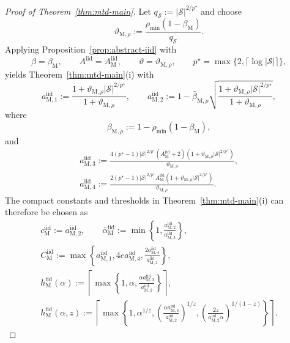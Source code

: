 \documentclass{article}
\newcommand{\X}{\mathcal{S}}
\begin{document}
\begin{proof}[Proof of Theorem~\ref{thm:mtd-main}]
Let $q_{\X}:=\lvert\X\rvert^{2/p^\star}$ and choose
\begin{equation}
\vartheta_{\mathrm M,\rho}:=\frac{\rho_{\min}(1-\beta_{\mathrm M})}{q_{\X}}.
\end{equation}
Applying Proposition~\ref{prop:abstract-iid} with
\begin{equation}
\beta = \beta_{\mathrm M}, \qquad A^{\mathrm{iid}} = A_{\mathrm M}^{\mathrm{iid}}, \qquad \vartheta = \vartheta_{\mathrm M,\rho}, \qquad p^\star = \max\{2,\lceil \log \lvert \X \rvert \rceil\},
\end{equation}
yields Theorem~\ref{thm:mtd-main}(i) with
\begin{equation}
a_{\mathrm M,1}^{\mathrm{iid}} := \frac{1 + \vartheta_{\mathrm M,\rho}\lvert \X \rvert^{2/p^\star}}{1+\vartheta_{\mathrm M,\rho}}, \qquad a_{\mathrm M,2}^{\mathrm{iid}} := 1-\bar\beta_{\mathrm M,\rho}\sqrt{\frac{1 + \vartheta_{\mathrm M,\rho}\lvert \X \rvert^{2/p^\star}}{1+\vartheta_{\mathrm M,\rho}}},
\end{equation}
where
\begin{equation}
\bar\beta_{\mathrm M,\rho} := 1-\rho_{\min}(1-\beta_{\mathrm M}),
\end{equation}
and
\begin{equation}
\begin{gathered}
a_{\mathrm M,3}^{\mathrm{iid}} := \frac{4(p^\star-1)\lvert \X \rvert^{2/p^\star}(A_{\mathrm M}^{\mathrm{iid}}+2)(1+\vartheta_{\mathrm M,\rho}\lvert \X \rvert^{2/p^\star})}{\vartheta_{\mathrm M,\rho}},\\
a_{\mathrm M,4}^{\mathrm{iid}} := \frac{2(p^\star-1)\lvert \X \rvert^{2/p^\star}A_{\mathrm M}^{\mathrm{iid}}(1+\vartheta_{\mathrm M,\rho}\lvert \X \rvert^{2/p^\star})}{\vartheta_{\mathrm M,\rho}}.
\end{gathered}
\end{equation}
The compact constants and thresholds in Theorem~\ref{thm:mtd-main}(i) can therefore be chosen as
\begin{equation}
\begin{gathered}
c_{\mathrm M}^{\mathrm{iid}}:=a_{\mathrm M,2}^{\mathrm{iid}},\qquad
\bar\alpha_{\mathrm M}^{\mathrm{iid}}:=\min\left\{1,\frac{a_{\mathrm M,2}^{\mathrm{iid}}}{a_{\mathrm M,3}^{\mathrm{iid}}}\right\},\\
C_{\mathrm M}^{\mathrm{iid}}:=\max\left\{a_{\mathrm M,1}^{\mathrm{iid}},4e a_{\mathrm M,4}^{\mathrm{iid}},\frac{2a_{\mathrm M,4}^{\mathrm{iid}}}{a_{\mathrm M,2}^{\mathrm{iid}}}\right\},\\
h_{\mathrm M}^{\mathrm{iid}}(\alpha):=\left\lceil\max\left\{1,\alpha,\frac{\alpha a_{\mathrm M,3}^{\mathrm{iid}}}{a_{\mathrm M,2}^{\mathrm{iid}}}\right\}\right\rceil,\\
h_{\mathrm M}^{\mathrm{iid}}(\alpha,z):=\left\lceil\max\left\{1,\alpha^{1/z},\left(\frac{\alpha a_{\mathrm M,3}^{\mathrm{iid}}}{a_{\mathrm M,2}^{\mathrm{iid}}}\right)^{1/z},\left(\frac{2z}{a_{\mathrm M,2}^{\mathrm{iid}}\alpha}\right)^{1/(1-z)}\right\}\right\rceil.
\end{gathered}
\end{equation}


\end{proof}
\end{document}
